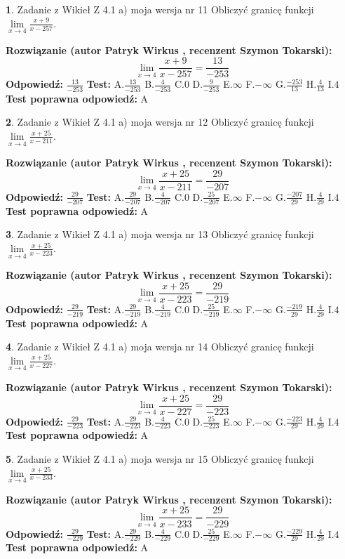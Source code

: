 \documentclass[12pt, a4paper]{article}
\theoremstyle{definition} %
\newtheorem{zad}{}
\newcommand{\zadStart}[1]{\begin{zad}#1\newline}
\newcommand{\zadStop}{\end{zad}}
\newcommand{\rozwStart}[2]{\noindent \textbf{Rozwiązanie (autor #1 , recenzent #2): }\newline}
\newcommand{\rozwStop}{\newline}
\newcommand{\odpStart}{\noindent \textbf{Odpowiedź:}\newline}
\newcommand{\odpStop}{\newline}
\newcommand{\testStart}{\noindent \textbf{Test:}\newline}
\newcommand{\testStop}{\newline}
\newcommand{\kluczStart}{\noindent \textbf{Test poprawna odpowiedź:}\newline}
\newcommand{\kluczStop}{\newline}
\begin{document}
\zadStart{Zadanie z Wikieł Z 4.1 a) moja wersja nr 11}
Obliczyć granicę funkcji $\lim\limits_{x\to4}\frac{x+9}{x-257}$.
\zadStop
\rozwStart{Patryk Wirkus}{Szymon Tokarski}
$$\lim\limits_{x\to4}\frac{x+9}{x-257} = \frac{13}{-253}$$
\rozwStop
\odpStart
$\frac{13}{-253}$
\odpStop
\testStart
A.$\frac{13}{-253}$
B.$\frac{4}{-253}$
C.$0$
D.$\frac{9}{-253}$
E.$\infty$
F.$-\infty$
G.$\frac{-253}{13}$
H.$\frac{4}{13}$
I.$4$
\testStop
\kluczStart
A
\kluczStop



\zadStart{Zadanie z Wikieł Z 4.1 a) moja wersja nr 12}
Obliczyć granicę funkcji $\lim\limits_{x\to4}\frac{x+25}{x-211}$.
\zadStop
\rozwStart{Patryk Wirkus}{Szymon Tokarski}
$$\lim\limits_{x\to4}\frac{x+25}{x-211} = \frac{29}{-207}$$
\rozwStop
\odpStart
$\frac{29}{-207}$
\odpStop
\testStart
A.$\frac{29}{-207}$
B.$\frac{4}{-207}$
C.$0$
D.$\frac{25}{-207}$
E.$\infty$
F.$-\infty$
G.$\frac{-207}{29}$
H.$\frac{4}{29}$
I.$4$
\testStop
\kluczStart
A
\kluczStop



\zadStart{Zadanie z Wikieł Z 4.1 a) moja wersja nr 13}
Obliczyć granicę funkcji $\lim\limits_{x\to4}\frac{x+25}{x-223}$.
\zadStop
\rozwStart{Patryk Wirkus}{Szymon Tokarski}
$$\lim\limits_{x\to4}\frac{x+25}{x-223} = \frac{29}{-219}$$
\rozwStop
\odpStart
$\frac{29}{-219}$
\odpStop
\testStart
A.$\frac{29}{-219}$
B.$\frac{4}{-219}$
C.$0$
D.$\frac{25}{-219}$
E.$\infty$
F.$-\infty$
G.$\frac{-219}{29}$
H.$\frac{4}{29}$
I.$4$
\testStop
\kluczStart
A
\kluczStop



\zadStart{Zadanie z Wikieł Z 4.1 a) moja wersja nr 14}
Obliczyć granicę funkcji $\lim\limits_{x\to4}\frac{x+25}{x-227}$.
\zadStop
\rozwStart{Patryk Wirkus}{Szymon Tokarski}
$$\lim\limits_{x\to4}\frac{x+25}{x-227} = \frac{29}{-223}$$
\rozwStop
\odpStart
$\frac{29}{-223}$
\odpStop
\testStart
A.$\frac{29}{-223}$
B.$\frac{4}{-223}$
C.$0$
D.$\frac{25}{-223}$
E.$\infty$
F.$-\infty$
G.$\frac{-223}{29}$
H.$\frac{4}{29}$
I.$4$
\testStop
\kluczStart
A
\kluczStop



\zadStart{Zadanie z Wikieł Z 4.1 a) moja wersja nr 15}
Obliczyć granicę funkcji $\lim\limits_{x\to4}\frac{x+25}{x-233}$.
\zadStop
\rozwStart{Patryk Wirkus}{Szymon Tokarski}
$$\lim\limits_{x\to4}\frac{x+25}{x-233} = \frac{29}{-229}$$
\rozwStop
\odpStart
$\frac{29}{-229}$
\odpStop
\testStart
A.$\frac{29}{-229}$
B.$\frac{4}{-229}$
C.$0$
D.$\frac{25}{-229}$
E.$\infty$
F.$-\infty$
G.$\frac{-229}{29}$
H.$\frac{4}{29}$
I.$4$
\testStop
\kluczStart
A
\kluczStop
\end{document}
